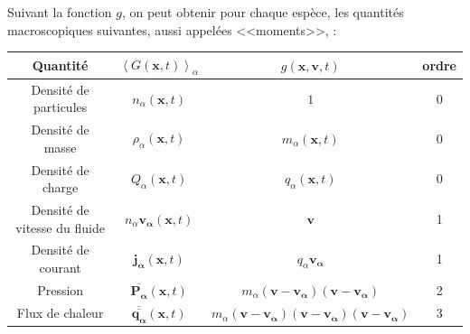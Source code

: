 Suivant la fonction $g$, on peut obtenir pour chaque espèce, les quantités macroscopiques suivantes, aussi appelées <<moments>>,  : 
\begin{table}[!ht]
\begin{center}
\begin{tabular}{ c|c|c|c } 
Quantité & $\left<G\left(\mathbf{x},t\right)\right>_{\alpha}$ & $g\left(\mathbf{x},\mathbf{v},t\right)$  & ordre\\
\hline
Densité de particules & $n_{\alpha}\left(\mathbf{x},t\right)$ & $1$  & 0 \\
Densité de masse & $\rho_{\alpha}\left(\mathbf{x},t\right)$ & $m_{\alpha}\left(\mathbf{x},t\right)$ & 0 \\
Densité de charge & $Q_{\alpha}\left(\mathbf{x},t\right)$ & $q_{\alpha}\left(\mathbf{x},t\right)$ & 0\\
Densité de vitesse du fluide & $n_{\alpha} \boldsymbol{v_{\alpha}}\left(\mathbf{x},t\right)$ & $\mathbf{v}$ & 1\\
Densité de courant & $\boldsymbol{j_{\alpha}}\left(\mathbf{x},t\right)$ & $q_{\alpha} \boldsymbol{v_{\alpha}}$ & 1\\
Pression & $\overline{\boldsymbol{P_{\alpha}}} \left(\mathbf{x},t\right)$ & $m_{\alpha}\left(\mathbf{v}-\boldsymbol{v_{\alpha}}\right)\left(\mathbf{v}-\boldsymbol{v_{\alpha}}\right)$ & 2\\
Flux de chaleur& $\overline{\overline{\boldsymbol{q_{\alpha}}}}\left(\mathbf{x},t\right)$ & $m_{\alpha}\left(\mathbf{v}-\boldsymbol{v_{\alpha}}\right)\left(\mathbf{v}-\boldsymbol{v_{\alpha}}\right)\left(\mathbf{v}-\boldsymbol{v_{\alpha}}\right)$ & 3\\
\end{tabular}
\end{center}
\end{table}


